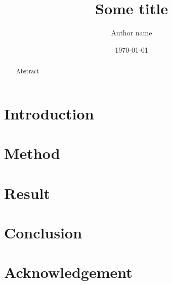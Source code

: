 \documentclass{article}
\title{Some title}
\author{Author name}
\affil[]{Affiliations}
\date{\today}
\begin{document}
\maketitle

\begin{abstract}
Abstract
\end{abstract}

\section{Introduction}



\section{Method}



\section{Result}



\section{Conclusion}



\section*{Acknowledgement}


\printbibliography
\end{document}
